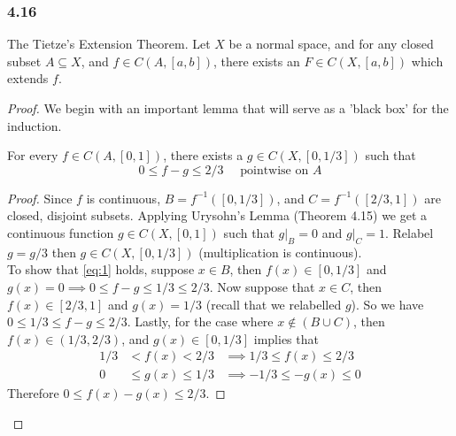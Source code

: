 \documentclass[../../main.tex]{subfiles}
\begin{document}
\subsubsection*{4.16}
\begin{wts}
The Tietze's Extension Theorem. Let $X$ be a normal space, and for any closed subset $A\subseteq X$, and $f\in C(A,[a,b])$, there exists an $F\in C(X,[a,b])$ which extends $f$.
\end{wts}
\begin{proof}
We begin with an important lemma that will serve as a 'black box' for the induction.
\begin{lemma}\label{lemma:1}
For every $f\in C(A,[0,1])$, there exists a $g\in C(X, [0, 1/3])$ such that 
\begin{equation}\label{eq:1}
0\leq f-g\leq 2/3 \quad\textrm{ pointwise on } A    
\end{equation}
\end{lemma}
\begin{proof}
Since $f$ is continuous, $B=f^{-1}([0,1/3])$, and $C=f^{-1}([2/3,1])$ are closed, disjoint subsets. Applying Urysohn's Lemma (Theorem 4.15) we get a continuous function $g\in C(X,[0,1])$ such that $g|_B = 0$ and $g|_C = 1$. Relabel $g=g/3$ then $g\in C(X,[0,1/3])$ (multiplication is continuous).\\

To show that \eqref{eq:1} holds, suppose $x\in B$, then $f(x)\in[0,1/3]$ and $g(x)=0\implies 0\leq f-g\leq 1/3\leq 2/3$. Now suppose that $x\in C$, then $f(x)\in[2/3,1]$ and $g(x)=1/3$ (recall that we relabelled $g$). So we have $0\leq 1/3\leq f-g\leq 2/3$. Lastly, for the case where $x\notin (B\cup C)$, then $f(x)\in (1/3, 2/3)$, and $g(x)\in[0, 1/3]$ implies that 
\begin{align*}
    1/3 &<    f(x) <    2/3 &\implies 1/3 \leq   f(x) \leq 2/3\\
    0   &\leq g(x) \leq 1/3 &\implies -1/3 \leq -g(x) \leq 0    
\end{align*}
Therefore $0\leq f(x)-g(x)\leq 2/3$.
\end{proof}


\end{proof}
\end{document}

